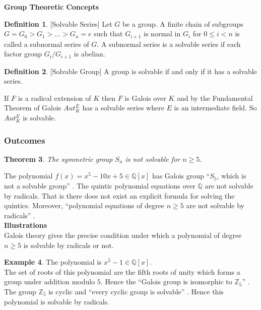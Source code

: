 \documentclass[11pt]{amsart}
\theoremstyle{plain}
\newtheorem{theorem}{Theorem}[section]
\theoremstyle{definition}
\newtheorem{definition}[theorem]{Definition}
\newtheorem{example}[theorem]{Example}
\numberwithin{equation}{section}
\begin{document}
\textbf{Group Theoretic Concepts}\\
\begin{definition} \cite{hunger} [Solvable Series]
  Let \(G\) be a group. A finite chain of subgroups \(G=G_0>G_1>...>G_n={e}\) such that \(G_{i+1}\) is normal in \(G_i\) for \(0 \leq i < n\) is called a subnormal series of \(G\). A subnormal series is a solvable series if each factor group \(G_i/G_{i+1}\) is abelian.
\end{definition}

\begin{definition} \cite{hunger} [Solvable Group]
A group is solvable if and only if it has a solvable series.
\end{definition}

If \(F\) is a radical extension of \(K\) then \(F\) is Galois over \(K\) and by the Fundamental Theorem of Galois \(Aut_K^E\) has a solvable series where \(E\) is an intermediate field. So \(Aut_K^E\) is solvable.

\subsubsection{Outcomes}
\begin{theorem} \cite{hunger}
The symmetric group \(S_n\) is not solvable for \(n \geq 5\).
\end{theorem}

The polynomial \(f(x)=x^5-10x+5 \in \mathbb{Q}[x]\) has Galois group ``\(S_5\), which is not a solvable group'' \cite{hunger}. The quintic polynomial equations over \(\mathbb{Q}\) are not solvable by radicals. That is there does not exist an explicit formula for solving the quintics. Moreover, ``polynomial equations of degree \(n \geq 5\) are not solvable by radicals'' \cite{hunger}.\\

\textbf{Illustrations}\\
Galois theory gives the precise condition under which a polynomial of degree \(n \geq 5\) is solvable by radicals or not.

\begin{example}
  The polynomial is \(x^5-1 \in \mathbb{Q}[x]\).\\
  The set of  roots of this polynomial are the fifth roots of unity which forms a group under addition modulo \(5\). Hence the ``Galois group is isomorphic to \(\mathbb{Z}_5\)'' \cite{hunger}. The group \(\mathbb{Z}_5\) is cyclic and ``every cyclic group is solvable'' \cite{galois}. Hence this polynomial is solvable by radicals.
\end{example}
\end{document}
